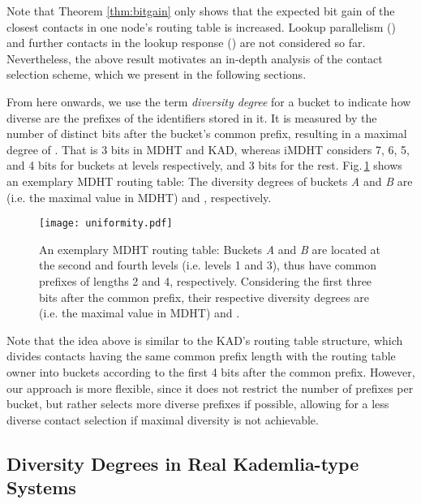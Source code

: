 \documentclass[10pt, conference, compsocconf, letterpaper]{IEEEtran}
\begin{document}
Note that Theorem \ref{thm:bitgain} only shows that the expected bit gain of the closest
contacts in one node's routing table is increased. Lookup parallelism () and further contacts in the lookup response () are not considered so far. Nevertheless, the above result motivates an in-depth analysis of the contact selection scheme, which we present in the following sections.

From here onwards, we use the term \emph{diversity degree} for a bucket to indicate how diverse are the prefixes of the identifiers stored in it. It is measured by the number of distinct  bits after the bucket's common prefix, resulting in a maximal degree of  . That is 3 bits in MDHT and KAD, whereas iMDHT considers 7, 6, 5, and 4 bits for buckets at levels  respectively, and 3 bits for the rest. Fig.\,\ref{fig:uniformity} shows an exemplary MDHT routing table: The diversity degrees of buckets \textit{A} and \textit{B} are  (i.e. the maximal value in MDHT) and , respectively.

\begin{figure} \centering
\captionsetup{font=scriptsize}
      \texttt{[image: uniformity.pdf]}
   \caption{An exemplary MDHT routing table: Buckets \textit{A} and \textit{B} are located at the second and fourth levels (i.e. levels 1 and 3), thus have common prefixes of lengths 2 and 4, respectively. Considering the first three bits after the common prefix, their respective diversity degrees are  (i.e. the maximal value in MDHT) and .}
   \label{fig:uniformity}
\end{figure}

Note that the idea above is similar to the KAD's routing table structure, which divides contacts having the same common prefix length with the routing table owner into buckets according to the first 4 bits after the common prefix. However, our approach is more flexible, since it does not restrict the number of prefixes per bucket, but rather selects more diverse prefixes if possible, allowing for a less diverse contact selection if maximal diversity is not achievable. 



\subsection{Diversity Degrees in Real Kademlia-type Systems} \label{subsec:real_diverse}
\end{document}
